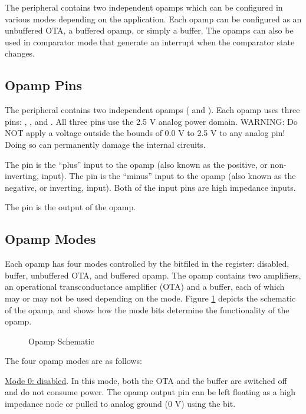 The  peripheral contains two independent opamps which can be configured in various modes depending on the application. Each opamp can be configured as an unbuffered OTA, a buffered opamp, or simply a buffer. The opamps can also be used in comparator mode that generate an interrupt when the comparator state changes.

\subsection{Opamp Pins}

The  peripheral contains two independent opamps ( and ). Each opamp uses three pins: , , and . All three pins use the 2.5 V analog power domain. WARNING: Do NOT apply a voltage outside the bounds of 0.0 V to 2.5 V to any analog pin! Doing so can permanently damage the internal circuits.

The  pin is the ``plus'' input to the opamp (also known as the positive, or non-inverting, input). The  pin is the ``minus'' input to the opamp (also known as the negative, or inverting, input). Both of the input pins are high impedance inputs.

The  pin is the output of the opamp.



\subsection{Opamp Modes}

Each opamp has four modes controlled by the  bitfiled in the  register: disabled, buffer, unbuffered OTA, and buffered opamp. The opamp contains two amplifiers, an operational transconductance amplifier (OTA) and a buffer, each of which may or may not be used depending on the mode. Figure \ref{fig:opamp-schematic} depicts the schematic of the opamp, and shows how the mode bits determine the functionality of the opamp.

\begin{figure}[htpb]
	\centering
	
	\caption{Opamp Schematic}
	\label{fig:opamp-schematic}
\end{figure}

The four opamp modes are as follows:

\underline{Mode 0: disabled}. In this mode, both the OTA and the buffer are switched off and do not consume power. The opamp output pin  can be left floating as a high impedance node or pulled to analog ground (0 V) using the  bit.

